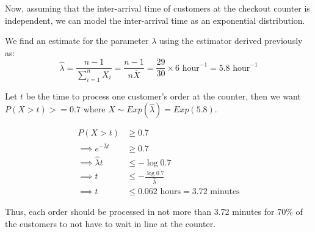 \documentclass[12pt, oneside]{article}
\begin{document}
\begin{enumerate}
{  Now, assuming that the inter-arrival time of customers at the checkout counter is independent,
  we can model the inter-arrival time as an exponential distribution.

  We find an estimate for the parameter \(\lambda\) using the estimator derived previously as:
  \[\widehat{\lambda} = \frac{n - 1}{\sum_{i=1}^{n} X_i} = \frac{n - 1}{n \overline{X}} = \frac{29}{30} \times 6 \text{ hour}^{-1} = 5.8 \text{ hour}^{-1}\]

  Let \(t\) be the time to process one customer's order at the counter, then we want
  \(P(X > t) >= 0.7\) where \(X \sim Exp(\widehat{\lambda}) = Exp(5.8)\).

  \begin{align*}
    P(X > t) &\geq 0.7 \\
    \implies e^{-\widehat{\lambda} t} &\geq 0.7 \\
    \implies \widehat{\lambda} t &\leq -\log{0.7} \\
    \implies t &\leq -\frac{\log{0.7}}{\widehat{\lambda}} \\
    \implies t &\leq 0.062 \text{ hours} = 3.72 \text{ minutes}
  \end{align*}

  Thus, each order should be processed in not more than 3.72 minutes for 70\% of the
  customers to not have to wait in line at the counter.
}


\end{enumerate}
\end{document}
